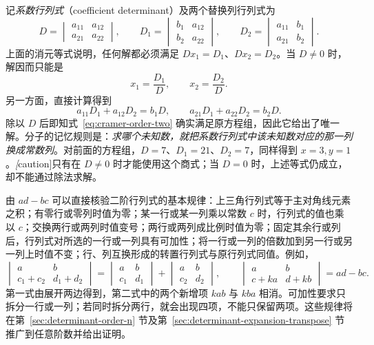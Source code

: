 记\emph{系数行列式}（coefficient determinant）及两个替换列行列式为
\[
    D=\begin{vmatrix}a_{11}&a_{12}\\a_{21}&a_{22}\end{vmatrix},\qquad
    D_1=\begin{vmatrix}b_1&a_{12}\\b_2&a_{22}\end{vmatrix},\qquad
    D_2=\begin{vmatrix}a_{11}&b_1\\a_{21}&b_2\end{vmatrix}.
\]
上面的消元等式说明，任何解都必须满足 $Dx_1=D_1$、$Dx_2=D_2$。当 $D\ne0$ 时，解因而只能是
\begin{equation}
\label{eq:cramer-order-two}
    x_1=\frac{D_1}{D},\qquad x_2=\frac{D_2}{D}.
\end{equation}
另一方面，直接计算得到
\[
    a_{11}D_1+a_{12}D_2=b_1D,\qquad
    a_{21}D_1+a_{22}D_2=b_2D.
\]
除以 $D$ 后即知式~\eqref{eq:cramer-order-two} 确实满足原方程组，因此它给出了唯一解。分子的记忆规则是：\emph{求哪个未知数，就把系数行列式中该未知数对应的那一列换成常数列}。对前面的方程组，$D=7$、$D_1=21$、$D_2=7$，同样得到 $x=3,y=1$。\emph[caution]{只有在 $D\ne0$ 时才能使用这个商式}；当 $D=0$ 时，上述等式仍成立，却不能通过除法求解。

由 $ad-bc$ 可以直接核验二阶行列式的基本规律：上三角行列式等于主对角线元素之积；有零行或零列时值为零；某一行或某一列乘以常数 $c$ 时，行列式的值也乘以 $c$；交换两行或两列时值变号；两行或两列成比例时值为零；固定其余行或列后，行列式对所选的一行或一列具有可加性；将一行或一列的倍数加到另一行或另一列上时值不变；行、列互换形成的转置行列式与原行列式同值。例如，
\[
    \begin{vmatrix}a&b\\c_1+c_2&d_1+d_2\end{vmatrix}
    =\begin{vmatrix}a&b\\c_1&d_1\end{vmatrix}
     +\begin{vmatrix}a&b\\c_2&d_2\end{vmatrix},\qquad
    \begin{vmatrix}a&b\\c+ka&d+kb\end{vmatrix}
    =ad-bc.
\]
第一式由展开两边得到，第二式中的两个新增项 $kab$ 与 $kba$ 相消。可加性要求只拆分一行或一列；若同时拆分两行，就会出现四项，不能只保留两项。这些规律将在第~\ref{sec:determinant-order-n} 节及第~\ref{sec:determinant-expansion-transpose} 节推广到任意阶数并给出证明。

